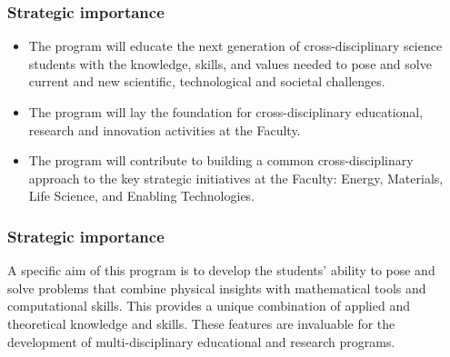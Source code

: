 \documentclass{beamer}
\begin{document}
\begin{frame}
\frametitle{Strategic importance}

\begin{block}{}
\begin{itemize}
\item The program will educate the next generation of cross-disciplinary science students with the knowledge, skills, and values needed to pose and solve current and new scientific, technological and societal challenges. 

\item The program will lay the foundation for cross-disciplinary educational, research and innovation activities at the Faculty. 

\item The program will contribute to building a common cross-disciplinary approach to the key strategic initiatives at the Faculty: Energy, Materials, Life Science, and Enabling Technologies.
\end{itemize}

\noindent
\end{block}
\end{frame}

\begin{frame}
\frametitle{Strategic importance}

\begin{block}{}
A specific aim of this program is to develop the students' ability to pose and
solve problems that combine physical insights with mathematical tools
and computational skills. This provides a unique combination
of applied and theoretical knowledge and skills. These features are invaluable
for the development of multi-disciplinary educational and research programs.
\end{block}
\end{frame}
\end{document}
